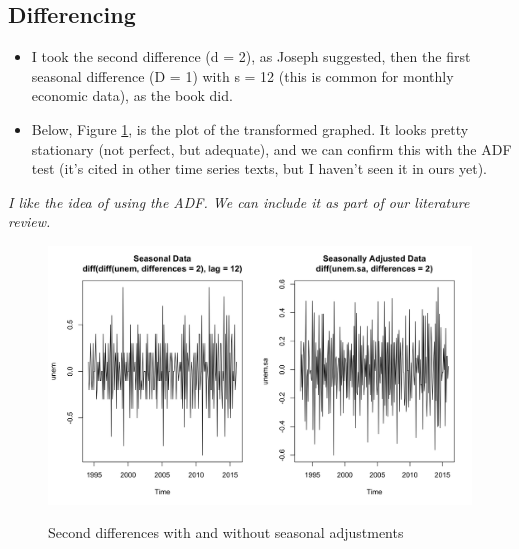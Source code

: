 	



  \subsection{Differencing}
  
\begin{itemize}
	\item I took the second difference (d = 2), as Joseph suggested, then the first seasonal difference (D = 1) with s = 12 (this is common for monthly economic data), as the book did.
      
    \item   Below, Figure \ref{fig:secdiff},  is the plot of the transformed graphed. It looks pretty stationary (not perfect, but adequate), and we can confirm this with the ADF test (it's cited in other time series texts, but I haven't seen it in ours yet).
\end{itemize}
      
      \textit{I like the idea of using the ADF. We can include it as part of our literature review.}
      
      
      \begin{figure}[H]
      	\centering
      	\caption{Second differences with and without seasonal adjustments}
      	\includegraphics[width=.7\linewidth]{images/stationarity}
      	\label{fig:secdiff}
      \end{figure}
      

    

